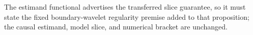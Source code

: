 The estimand functional advertises the transferred slice guarantee, so it must state the fixed boundary-wavelet regularity premise added to that proposition; the causal estimand, model slice, and numerical bracket are unchanged.
